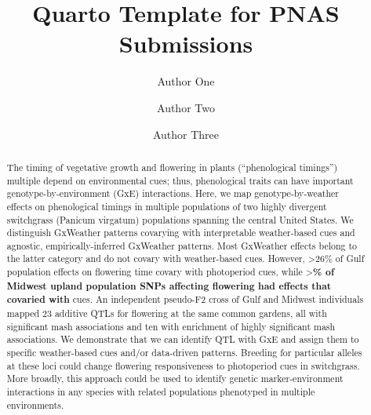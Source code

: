 \documentclass[
  9pt,
  twocolumn,
  twoside]{pnas-new}
\title{Quarto Template for PNAS Submissions}
\author[a,c%
,\equalcont%
%
]{Author One}
\author[b%
,\equalcont%
,\correspond%
]{Author Two}
\author[a%
%
%
]{Author Three}
\affil[a]{Harvard University, Department of Government, Cambridge, 2138}
\affil[c]{Harvard University, Department of Statistics, Cambridge, 2138}
\affil[b]{Yale University, Department of Political Science, New
Haven, 3401}
\begin{document}
\maketitle

\begin{abstract}
The timing of vegetative growth and flowering in plants (``phenological
timings'') multiple depend on environmental cues; thus, phenological
traits can have important genotype-by-environment (GxE) interactions.
Here, we map genotype-by-weather effects on phenological timings in
multiple populations of two highly divergent switchgrass (Panicum
virgatum) populations spanning the central United States. We distinguish
GxWeather patterns covarying with interpretable weather-based cues and
agnostic, empirically-inferred GxWeather patterns. Most GxWeather
effects belong to the latter category and do not covary with
weather-based cues. However, \textgreater26\% of Gulf population effects
on flowering time covary with photoperiod cues, while
\textgreater{}\textbf{\% of Midwest upland population SNPs affecting
flowering had effects that covaried with } cues. An independent
pseudo-F2 cross of Gulf and Midwest individuals mapped 23 additive QTLs
for flowering at the same common gardens, all with significant mash
associations and ten with enrichment of highly significant mash
associations. We demonstrate that we can identify QTL with GxE and
assign them to specific weather-based cues and/or data-driven patterns.
Breeding for particular alleles at these loci could change flowering
responsiveness to photoperiod cues in switchgrass. More broadly, this
approach could be used to identify genetic marker-environment
interactions in any species with related populations phenotyped in
multiple environments.
\end{abstract}


\thispagestyle{firststyle}
\end{document}
